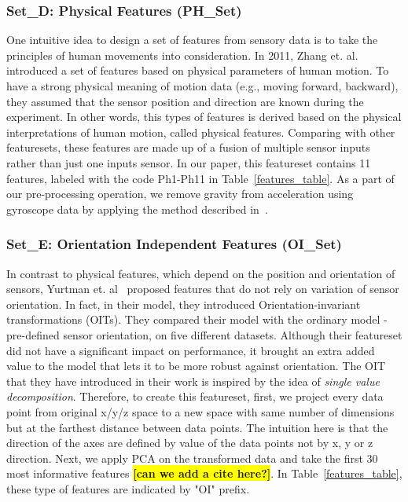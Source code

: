 \documentclass[journal,article,submit,moreauthors,pdftex]{Definitions/mdpi}
\newcommand{\todo}[1]{\colorbox{yellow}{\textbf{[#1]}}}
\begin{document}
\subsubsection{Set\_D: Physical Features (PH\_Set)}
One intuitive idea to design a set of features from sensory data is to take the principles of human movements into consideration. In 2011, Zhang et. al. ~\cite{zhang2011feature} introduced a set of features based on physical parameters of human motion. To have a strong physical meaning of motion data (e.g., moving forward, backward), they assumed that the sensor position and direction are known during the experiment. In other words, this types of features is derived based on the physical interpretations of human motion, called physical features. Comparing with other featuresets, these features are made up of a fusion of multiple sensor inputs rather than just one inputs sensor. In our paper, this featureset contains 11 features, labeled with the code Ph1-Ph11 in Table~\ref{features_table}. As a part of our pre-processing operation, we remove gravity from acceleration using gyroscope data by applying the method described in~\cite{Accelero5:online}.

\subsubsection{Set\_E: Orientation Independent Features (OI\_Set)}
In contrast to physical features, which depend on the position and orientation of sensors, Yurtman et. al~\cite{yurtman2017activity} proposed features that do not rely on variation of sensor orientation. In fact, in their model, they introduced Orientation-invariant transformations (OITs). They compared their model with the ordinary model - pre-defined sensor orientation, on five different datasets. Although their featureset did not have a significant impact on performance, it brought an extra added value to the model that lets it to be more robust against orientation. The OIT that they have introduced in their work is inspired by the idea of \textit{single value decomposition}\cite{moon2000mathematical}. Therefore, to create this featureset, first, we project every data point from original x/y/z space to a new space with same number of dimensions but at the farthest distance between data points. The intuition here is that the direction of the axes are defined by value of the data points not by x, y or z direction. Next, we apply PCA on the transformed data and take the first 30 most informative features \cite{janidarmian2017comprehensive} \todo{can we add a cite here?}. In Table~\ref{features_table}, these type of features  are indicated by "OI" prefix.
\end{document}
